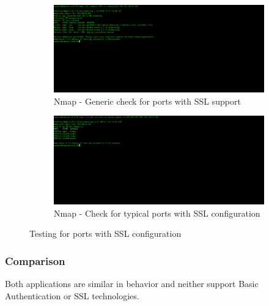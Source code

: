 \begin{figure}[ht]
	\centering
	\begin{subfigure}{.45\textwidth}
		\centering
		\includegraphics[width=.9\linewidth]{figures/OTG-CRYPST-001_1.png}
		\caption{Nmap - Generic check for ports with SSL support}
	\end{subfigure}\hfill%
	\begin{subfigure}{.45\textwidth}
		\centering
		\includegraphics[width=.9\linewidth]{figures/OTG-CRYPST-001_2.png}
		\caption{Nmap - Check for typical ports with SSL configuration}
	\end{subfigure}
	\caption{Testing for ports with SSL configuration}
	\label{fig:nmap_ssl_ports}
\end{figure}

\subsubsection{Comparison}
Both applications are similar in behavior and neither support Basic Authentication or SSL technologies.
\clearpage
